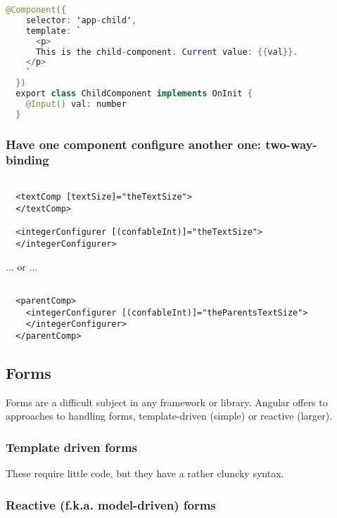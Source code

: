 \begin{lstlisting}[language=java, caption=Child]
  @Component({
    selector: 'app-child',
    template: `
      <p>
      This is the child-component. Current value: {{val}}.
    </p>
    `
  })
  export class ChildComponent implements OnInit { 
    @Input() val: number
  }
\end{lstlisting}


\subsubsection{Have one component configure another one: two-way-binding}
\begin{lstlisting}

  <textComp [textSize]="theTextSize">
  </textComp>

  <integerConfigurer [(confableInt)]="theTextSize">
  </integerConfigurer>

\end{lstlisting}
... or ...
\begin{lstlisting}

  <parentComp>
    <integerConfigurer [(confableInt)]="theParentsTextSize">
    </integerConfigurer>
  </parentComp>

\end{lstlisting}



\subsection{Forms}
Forms are a difficult subject in any framework or library. Angular offers to approaches to handling forms, template-driven (simple) or reactive (larger).

\subsubsection{Template driven forms}
These require little code, but they have a rather cluncky syntax.

\subsubsection{Reactive (f.k.a. model-driven) forms}

